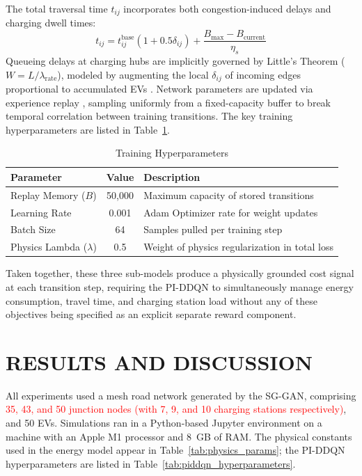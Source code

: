 \documentclass[conference]{IEEEtran}
\begin{document}
The total traversal time $t_{ij}$ incorporates both congestion-induced delays and charging dwell times:
\begin{equation}
t_{ij} = t_{ij}^{\text{base}}\left(1 + 0.5 \delta_{ij}\right) + \frac{B_{\max} - B_{\text{current}}}{\eta_s}
\end{equation}
Queueing delays at charging hubs are implicitly governed by Little's Theorem ($W = L / \lambda_{\text{rate}}$), modeled by augmenting the local $\delta_{ij}$ of incoming edges proportional to accumulated EVs \cite{little1961}. 
Network parameters are updated via experience replay \cite{lin1992self}, sampling uniformly from a fixed-capacity buffer to break temporal correlation between training transitions. The key training hyperparameters are listed in Table~\ref{tab:training_hyperparameters}.

\begin{table}[htbp]
\centering
\caption{Training Hyperparameters}
\label{tab:training_hyperparameters}
\renewcommand{\arraystretch}{1.2}
\setlength{\tabcolsep}{6pt}
\small
\begin{tabular}{|l|c|p{4.3cm}|}
\hline
\textbf{Parameter} & \textbf{Value} & \textbf{Description} \\ \hline
Replay Memory ($B$) & 50,000 & Maximum capacity of stored transitions \\ \hline
Learning Rate & 0.001 & Adam Optimizer rate for weight updates \\ \hline
Batch Size & 64 & Samples pulled per training step \\ \hline
Physics Lambda ($\lambda$) & 0.5 & Weight of physics regularization in total loss \\ \hline
\end{tabular}
\end{table}

Taken together, these three sub-models produce a physically grounded cost signal at each transition step, requiring the PI-DDQN to simultaneously manage energy consumption, travel time, and charging station load without any of these objectives being specified as an explicit separate reward component.

\section{RESULTS AND DISCUSSION}
\label{IV}

All experiments used a mesh road network generated by the SG-GAN, comprising \textcolor{red}{35, 43, and 50 junction nodes (with 7, 9, and 10 charging stations respectively)}, and 50 EVs. Simulations ran in a Python-based Jupyter environment on a machine with an Apple M1 processor and 8~GB of RAM. The physical constants used in the energy model appear in Table~\ref{tab:physics_params}; the PI-DDQN hyperparameters are listed in Table~\ref{tab:piddqn_hyperparameters}.
\end{document}
